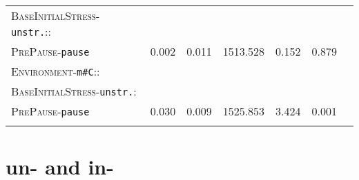 \begin{table}
{\begin{tabular}{lSSSSSS}
		\textsc{BaseInitialStress}-\texttt{unstr.}::&&&&&\\
		\textsc{PrePause}-\texttt{pause} & \color{lsLightGray}0.002 & \color{lsLightGray}0.011 & \color{lsLightGray}1513.528 & \color{lsLightGray}0.152 &\color{lsLightGray}0.879 \\ 
		\textsc{Environment}-\texttt{m\#C}::&&&&&\\
		\textsc{BaseInitialStress}-\texttt{unstr.}:&&&&&\\
		\textsc{PrePause}-\texttt{pause }& 0.030 & 0.009 & 1525.853 & 3.424 & 0.001 \\ 
		\lspbottomrule 
			\end{tabular}}
\end{table}
\clearpage

\section{{un-} and in-}


